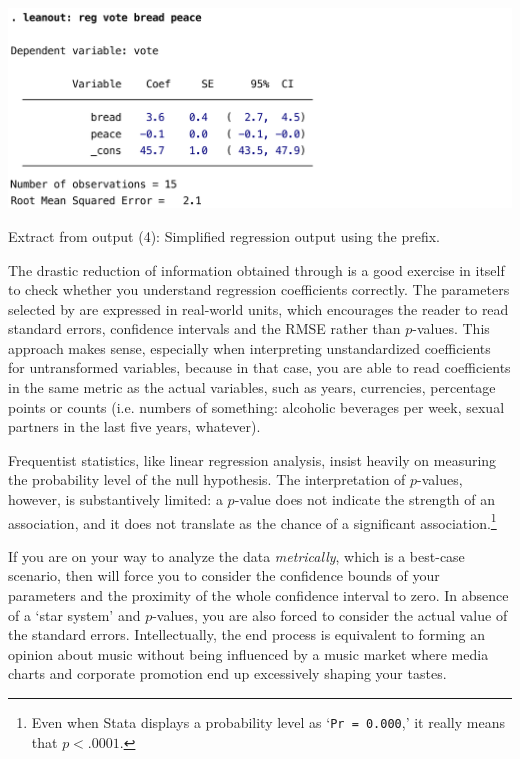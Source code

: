	\begin{table}[htp]
		\includegraphics[scale=.5]{images/hibbs_yx1x2_leanout.pdf}

	  	\caption[Extract from  output (4): Simplified regression output]{\label{tbl:hibbs_yx1x2_leanout}
		Extract from  output (4): Simplified regression output using the  prefix.\\
		\hibbs}
	\end{table}%
	
	The drastic reduction of information obtained through  is a good exercise in itself to check whether you understand regression coefficients correctly. The parameters selected by  are expressed in real-world units, which encourages the reader to read standard errors, confidence intervals and the RMSE rather than $p$-values. This approach makes sense, especially when interpreting unstandardized coefficients for untransformed variables, because in that case, you are able to read coefficients in the same metric as the actual variables, such as years, currencies, percentage points or counts (i.e. numbers of something: alcoholic beverages per week, sexual partners in the last five years, whatever).

	Frequentist statistics, like linear regression analysis, insist heavily on measuring the probability level of the null hypothesis. The interpretation of $p$-values, however, is substantively limited: a $p$-value does not indicate the strength of an association, and it does not translate as the chance of a significant association.\footnote{Even when Stata displays a probability level as `\texttt{Pr = 0.000},' it really means that $p < .0001$.}
	
	If you are on your way to analyze the data \emph{metrically}, which is a best-case scenario, then  will force you to consider the confidence bounds of your parameters and the proximity of the whole confidence interval to zero. In absence of a `star system' and $p$-values, you are also forced to consider the actual value of the standard errors. Intellectually, the end process is equivalent to forming an opinion about music without being influenced by a music market where media charts and corporate promotion end up excessively shaping your tastes.
	
